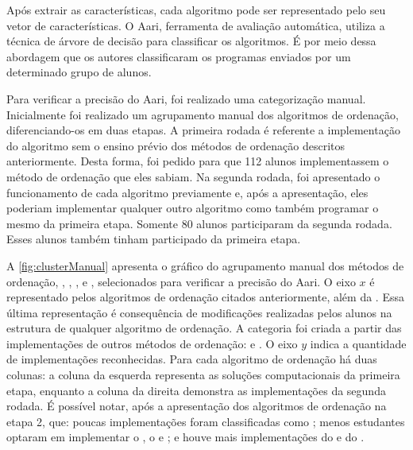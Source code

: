 		Após extrair as características, cada algoritmo pode ser representado pelo seu
		vetor de características. O Aari, ferramenta de avaliação automática, utiliza  %
		a técnica de árvore de decisão para classificar os algoritmos. É por meio
		dessa abordagem que os autores classificaram os programas enviados por um
		determinado grupo de alunos.
		
		Para verificar a precisão do Aari, foi realizado uma categorização manual.
		Inicialmente foi realizado um agrupamento manual dos algoritmos de ordenação,
		diferenciando-os em duas etapas. A primeira rodada é referente a implementação
		do algoritmo sem o ensino prévio dos métodos de ordenação descritos
		anteriormente. Desta forma, foi pedido para que 112 alunos implementassem o
		método de ordenação que eles sabiam. Na segunda rodada, foi apresentado
		o funcionamento de cada algoritmo previamente e, após a apresentação, eles
		poderiam implementar qualquer outro algoritmo como também programar o mesmo
		da primeira etapa. Somente 80 alunos participaram da segunda rodada. Esses
		alunos também tinham participado da primeira etapa.
		
		A \cref{fig:clusterManual} apresenta o gráfico do agrupamento manual
		dos métodos de ordenação, , ,
		,  e ,
		selecionados para verificar a precisão do Aari. O eixo $x$ é representado
		pelos algoritmos de ordenação citados anteriormente, além da
		. Essa última representação é consequência
		de modificações realizadas pelos alunos na estrutura de qualquer algoritmo de
		ordenação. A categoria  foi criada a partir das implementações
		de outros métodos de ordenação:  e . O
		eixo $y$ indica a quantidade de implementações reconhecidas. Para cada algoritmo
		de ordenação há duas colunas: a coluna da esquerda representa as soluções
		computacionais da primeira etapa, enquanto a coluna da direita demonstra as
		implementações da segunda rodada. É possível notar, após a apresentação dos
		algoritmos de ordenação na etapa 2, que: poucas implementações foram classificadas
		como ; menos estudantes optaram em implementar o
		, o  e ; e houve
		mais implementações do  e do .
		
